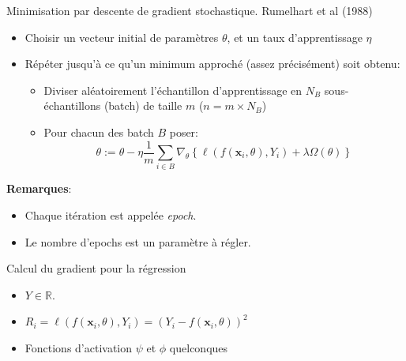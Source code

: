 \documentclass[ignorenonframetext,]{beamer}
\providecommand{\tightlist}{%
  \setlength{\itemsep}{0pt}\setlength{\parskip}{0pt}}
\begin{document}
\begin{frame}{Minimisation par descente de gradient stochastique.
Rumelhart et al (1988)}

\begin{itemize}
\item
  Choisir un vecteur initial de paramètres \(\theta\), et un taux
  d'apprentissage \(\eta\)
\item
  Répéter jusqu'à ce qu'un minimum approché (assez précisément) soit
  obtenu:

  \begin{itemize}
  \tightlist
  \item
    Diviser aléatoirement l'échantillon d'apprentissage en \(N_B\)
    sous-échantillons (batch) de taille \(m\) (\(n = m \times N_B\))
  \item
    Pour chacun des batch \(B\) poser:
    \[ \theta:= \theta - \eta \frac{1}{m}\sum_{i \in B} \nabla_{\theta} \left\{  \ell(f(\mathbf{x}_i,\theta),Y_i) + \lambda   \Omega(\theta)\right\}\]
  \end{itemize}
\end{itemize}

\textbf{Remarques}:

\begin{itemize}
\item
  Chaque itération est appelée \emph{epoch}.
\item
  Le nombre d'epochs est un paramètre à régler.
\end{itemize}

\end{frame}

\begin{frame}{Calcul du gradient pour la régression}

\begin{itemize}
\tightlist
\item
  \(Y \in \mathbb{R}\).
\item
  \(R_i = \ell(f(\mathbf{x}_i,\theta),Y_i) = (Y_{i} - f(\mathbf{x}_i,\theta))^2\)
\item
  Fonctions d'activation \(\psi\) et \(\phi\) quelconques
\end{itemize}

\end{frame}
\end{document}

